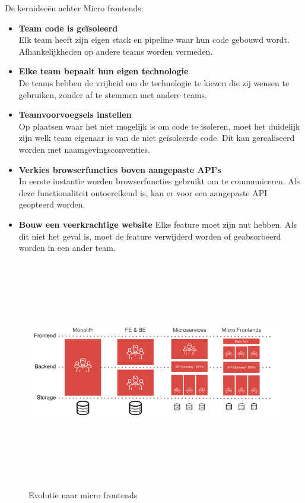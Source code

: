 De kernideeën achter Micro frontends:
\begin{itemize}
    \item \textbf{Team code is geïsoleerd} \\
          Elk team heeft zijn eigen stack en pipeline waar hun code gebouwd wordt. Afhankelijkheden op andere teams worden vermeden.
    \item \textbf{Elke team bepaalt hun eigen technologie} \\
          De teams hebben de vrijheid om de technologie te kiezen die zij wensen te gebruiken, zonder af te stemmen met andere teams. 
    \item \textbf{Teamvoorvoegsels instellen}\\
          Op plaatsen waar het niet mogelijk is om code te isoleren, moet het duidelijk zijn welk team eigenaar is van de niet geïsoleerde code. Dit kan gerealiseerd worden met naamgevingsconventies.  
    \item \textbf{Verkies browserfuncties boven aangepaste API’s}\\
          In eerste instantie worden browserfuncties gebruikt om te communiceren. Als deze functionaliteit ontoereikend is, kan er voor een aangepaste API geopteerd worden. 
    \item \textbf{Bouw een veerkrachtige website}
          Elke feature moet zijn nut hebben. Als dit niet het geval is, moet de feature verwijderd worden of geabsorbeerd worden in een ander team.\\
\end{itemize}
\begin{figure}[!htb]
    \centering
    \includegraphics[height=10cm, width=15cm]{MicroFrontendsVertical.png}
    \caption{Evolutie naar micro frontends \label{microfrontends}}
\end{figure}

